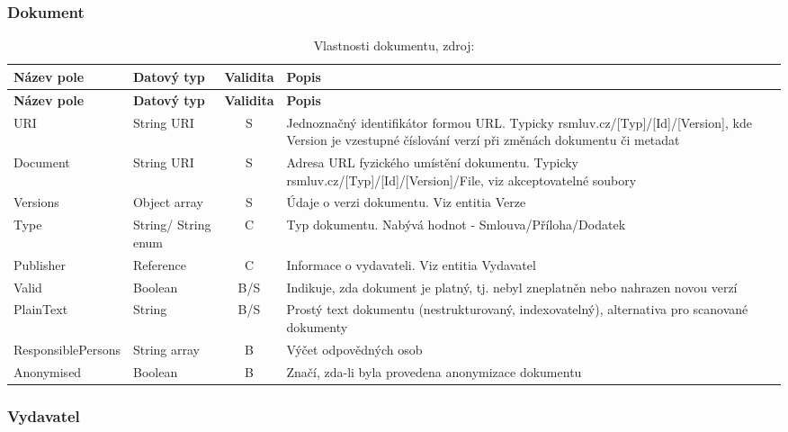 \subsubsection*{Dokument}

\begin{center}
\begin{longtable}{lp{20mm}cp{65mm}}
\label{grid_mlmmh} \\
\multicolumn{1}{l}{\textbf{Název pole}} & 
\multicolumn{1}{l}{\textbf{Datový typ}} & 
\multicolumn{1}{l}{\textbf{Validita}} & 
\multicolumn{1}{l}{\textbf{Popis}} \\ \hline 
\endfirsthead
\multicolumn{1}{l}{\textbf{Název pole}} & 
\multicolumn{1}{l}{\textbf{Datový typ}} & 
\multicolumn{1}{l}{\textbf{Validita}} & 
\multicolumn{1}{l}{\textbf{Popis}} \\ \hline 
\hline
\endhead
\endfoot
\caption{Vlastnosti dokumentu, zdroj:\protect\cite{metodika}}
\endlastfoot
\rowcolor{validateS}URI & String URI & S & Jednoznačný identifikátor formou URL. Typicky rsmluv.cz/[Typ]/[Id]/[Version], kde Version je vzestupné číslování verzí při změnách dokumentu či metadat \\
\rowcolor{validateS}Document & String URI & S & Adresa URL fyzického umístění dokumentu. Typicky rsmluv.cz/[Typ]/[Id]/[Version]/File, viz akceptovatelné soubory \\
\rowcolor{validateS}Versions & Object array & S & Údaje o verzi dokumentu. Viz entitia Verze \\
\rowcolor{validateC}Type & String/ String enum & C & Typ dokumentu. Nabývá hodnot - Smlouva/Příloha/Dodatek \\
\rowcolor{validateC}Publisher & Reference & C & Informace o vydavateli. Viz entitia Vydavatel \\
\rowcolor{validateB}Valid & Boolean & B/S & Indikuje, zda dokument je platný, tj. nebyl zneplatněn nebo nahrazen novou verzí \\
\rowcolor{validateB}PlainText & String & B/S & Prostý text dokumentu (nestrukturovaný, indexovatelný), alternativa pro scanované dokumenty \\
\rowcolor{validateB}ResponsiblePersons & String array & B & Výčet odpovědných osob \\
\rowcolor{validateB}Anonymised & Boolean & B & Značí, zda-li byla provedena anonymizace dokumentu \\
\end{longtable}
\end{center}

\subsubsection*{Vydavatel}

